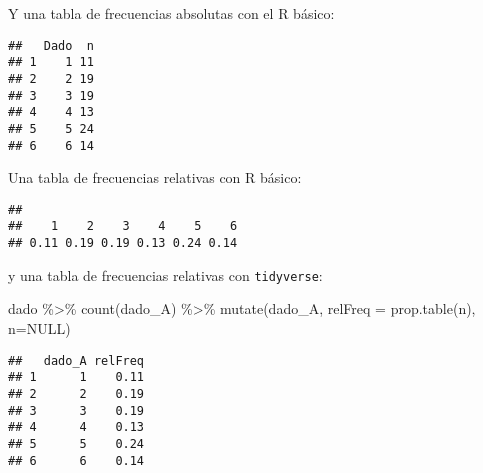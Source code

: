 \documentclass[
]{article}
\newenvironment{Shaded}{\begin{snugshade}}{\end{snugshade}}
\newcommand{\AttributeTok}[1]{\textcolor[rgb]{0.77,0.63,0.00}{#1}}
\newcommand{\ConstantTok}[1]{\textcolor[rgb]{0.00,0.00,0.00}{#1}}
\newcommand{\DecValTok}[1]{\textcolor[rgb]{0.00,0.00,0.81}{#1}}
\newcommand{\FunctionTok}[1]{\textcolor[rgb]{0.00,0.00,0.00}{#1}}
\newcommand{\NormalTok}[1]{#1}
\newcommand{\OtherTok}[1]{\textcolor[rgb]{0.56,0.35,0.01}{#1}}
\newcommand{\SpecialCharTok}[1]{\textcolor[rgb]{0.00,0.00,0.00}{#1}}
\begin{document}
Y una tabla de frecuencias absolutas con el R básico:

\begin{Shaded}
\end{Shaded}

\begin{verbatim}
##   Dado  n
## 1    1 11
## 2    2 19
## 3    3 19
## 4    4 13
## 5    5 24
## 6    6 14
\end{verbatim}

Una tabla de frecuencias relativas con R básico:

\begin{Shaded}
\end{Shaded}

\begin{verbatim}
## 
##    1    2    3    4    5    6 
## 0.11 0.19 0.19 0.13 0.24 0.14
\end{verbatim}

y una tabla de frecuencias relativas con \texttt{tidyverse}:

\begin{Shaded}
\begin{Highlighting}[]
\NormalTok{dado }\SpecialCharTok{\%\textgreater{}\%}
  \FunctionTok{count}\NormalTok{(dado\_A) }\SpecialCharTok{\%\textgreater{}\%}
  \FunctionTok{mutate}\NormalTok{(dado\_A, }\AttributeTok{relFreq =} \FunctionTok{prop.table}\NormalTok{(n), }\AttributeTok{n=}\ConstantTok{NULL}\NormalTok{)}
\end{Highlighting}
\end{Shaded}

\begin{verbatim}
##   dado_A relFreq
## 1      1    0.11
## 2      2    0.19
## 3      3    0.19
## 4      4    0.13
## 5      5    0.24
## 6      6    0.14
\end{verbatim}
\end{document}
